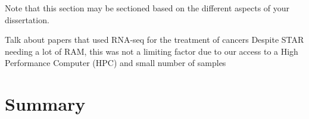 Note that this section may be sectioned based on the different aspects of your dissertation.

Talk about papers that used RNA-seq for the treatment of cancers
Despite STAR needing a lot of RAM, this was not a limiting factor due to our access to a High Performance Computer (HPC) and small number of samples








\section{Summary}
